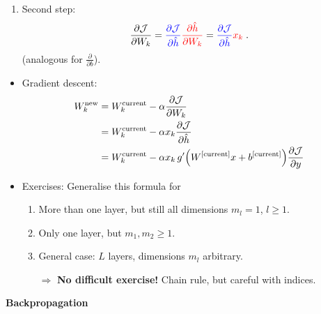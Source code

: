 \documentclass[10pt,hyperref={pdfpagelabels=false}]{beamer}
\begin{document}
\begin{frame}[allowframebreaks]
\begin{minipage}{.6\textwidth}
{\begin{itemize}
\begin{enumerate}
$$                \;.
                $$
                \item Second step:
                $$
                \frac{\partial\mathcal{J}}{\partial W_k} =
                {\color{blue}\frac{\partial\mathcal{J}}{\partial \hat{h}}}
                {\color{red}
                \frac{\partial \hat{h}}{\partial W_k}
                }=
                {\color{blue}\frac{\partial\mathcal{J}}{\partial \hat{h}}}
                {\color{red}
                x_k
                }
                \;.
                $$
                (analogous for $\frac{\partial}{\partial b}$).
            \end{enumerate}
        \end{itemize}
        }
    \end{minipage}
    \begin{minipage}{.3\textwidth}
        
    \end{minipage}
    \framebreak
    \begin{itemize}
        \item Gradient descent:
        \begin{equation*}
            \begin{split}
                W_k^{\text{new}} &=
                W_k^{\text{current}} -
                \learningrate \frac{\partial\loss}{\partial W_k}\\
                &= W^{\text{current}}_k -
                \learningrate x_k \frac{\partial\loss}{\partial \hat{h}}\\
                &= W^{\text{current}}_k -
                \learningrate x_k\, g'\left(W^{[\text{current}]}x+b^{[\text{current}]}\right)
                \frac{\partial\loss}{\partial y}
            \end{split}
        \end{equation*}
        \item Exercises: Generalise this formula for
        \begin{enumerate}
            \item More than one layer, but still all dimensions $m_l=1$, $l\geq 1$.
            \item Only one layer, but $m_1, m_2\geq 1$.
            \item General case: $L$ layers, dimensions $m_l$ arbitrary.
            \item[$\Rightarrow$] {\bf No difficult exercise!} Chain rule, but careful with indices.
        \end{enumerate}
    \end{itemize}
    \begin{center}
    {\huge {\bf Backpropagation}}
    \end{center}
\end{frame}
\end{document}
